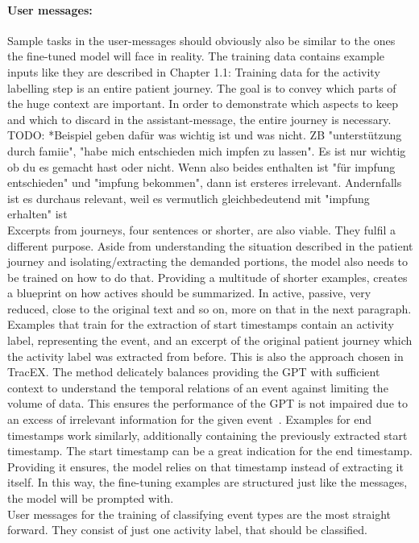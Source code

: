 \paragraph{User messages:} Sample tasks in the user-messages should obviously also be similar to the ones the fine-tuned model will face in reality. The training data contains example inputs like they are described in Chapter 1.1: Training data for the activity labelling step is an entire patient journey. The goal is to convey which parts of the huge context are important. In order to demonstrate which aspects to keep and which to discard in the assistant-message, the entire journey is necessary.\\
TODO: *Beispiel geben dafür was wichtig ist und was nicht. ZB "unterstützung durch famiie", "habe mich entschieden mich impfen zu lassen". Es ist nur wichtig ob du es gemacht hast oder nicht. Wenn also beides enthalten ist "für impfung entschieden" und "impfung bekommen", dann ist ersteres irrelevant. Andernfalls ist es durchaus relevant, weil es vermutlich  gleichbedeutend mit "impfung erhalten" ist\\
Excerpts from journeys, four sentences or shorter, are also viable. They fulfil a different purpose. Aside from understanding the situation described in the patient journey and isolating/extracting the demanded portions, the model also needs to be trained on how to do that. Providing a multitude of shorter examples, creates a blueprint on how actives should be summarized. In active, passive, very reduced, close to the original text and so on, more on that in the next paragraph. Examples that train for the extraction of start timestamps contain an activity label, representing the event, and an excerpt of the original patient journey which the activity label was extracted from before. This is also the approach chosen in TracEX. The method delicately balances providing the GPT with sufficient context to understand the temporal relations of an event against limiting the volume of data. This ensures the performance of the GPT is not impaired due to an excess of irrelevant information for the given event~\cite{han_is_2023}.
Examples for end timestamps work similarly, additionally containing the previously extracted start timestamp. The start timestamp can be a great indication for the end timestamp. Providing it ensures, the model relies on that timestamp instead of extracting it itself.
In this way, the fine-tuning examples are structured just like the messages, the model will be prompted with.\\
User messages for the training of classifying event types are the most straight forward. They consist of just one activity label, that should be classified.

